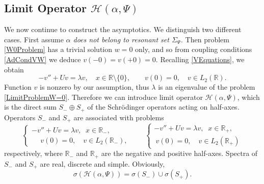 \documentclass[11pt,english]{amsart}
\begin{document}
\subsection{Limit Operator $\mathcal{H}(\alpha,\Psi)$}\label{SubsecLimitOperator}
 We now continue to construct the asymptotics. We distinguish two different cases.
First assume  \emph{$\alpha$ does not belong to  resonant set $\Sigma_\Psi$.}
Then problem \eqref{W0Problem} has  a trivial solution $w=0$ only, and so from  coupling conditions \eqref{AdCondVW} we deduce $v(-0)=v(+0)=0$.  Recalling \eqref{VEquations}, we obtain
\begin{equation}\label{LimitProblemW=0}
 - v''+Uv=\lambda v,\quad x\in\mathbb{R}\setminus\{0\}, \qquad v(0)=0, \quad v\in L_2(\mathbb{R}).
\end{equation}
Function $v$  is nonzero by our assumption, thus $\lambda$ is an eigenvalue of the problem \eqref{LimitProblemW=0}.
Therefore we can introduce limit operator $\mathcal{H}(\alpha,\Psi)$, which is the direct sum $S_-\oplus S_+$
of the Schr\"{o}dinger operators acting on half-axes. Operators $S_-$ and $S_+$ are associated with problems
\begin{equation}\label{AxisProblem}
\begin{cases}
   -v''+Uv=\lambda v,\;\; x\in \mathbb{R}_-,\\
   \phantom{-}v(0)=0, \quad v\in L_2(\mathbb{R}_-),
\end{cases}\qquad
\begin{cases}
   -v''+Uv=\lambda v,\;\; x\in \mathbb{R}_+,\\
   \:v(0)=0, \quad v\in L_2(\mathbb{R}_+)
\end{cases}
\end{equation}
respectively, where $\mathbb{R}_-$ and $\mathbb{R}_+$ are the negative and positive half-axes.
Spectra of  $S_-$ and $S_+$ are real, discrete and simple. Obviously, $$\sigma(\mathcal{H}(\alpha,\Psi))=\sigma(S_-)\cup\sigma(S_+).$$
\end{document}
